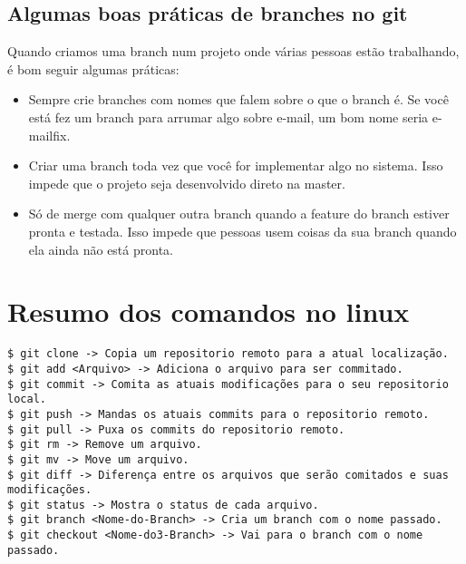 \documentclass{article}
\begin{document}
\subsection{Algumas boas práticas de branches no git}
    Quando criamos uma branch num projeto onde várias pessoas estão trabalhando, é
bom seguir algumas práticas:
\begin{itemize}
    \item Sempre crie branches com nomes que falem sobre o que o branch é. Se
            você está fez um branch para arrumar algo sobre e-mail, um bom nome
            seria e-mailfix.
    \item Criar uma branch toda vez que você for implementar algo no sistema.
            Isso impede que o projeto seja desenvolvido direto na master.
    \item Só de merge com qualquer outra branch quando a feature do branch 
            estiver pronta e testada. Isso impede que pessoas usem coisas
            da sua branch quando ela ainda não está pronta.
\end{itemize}

\section{Resumo dos comandos no linux}
\begin{tabbing}
\hspace{0.5cm}  \=  \verb#$ git clone -> Copia um repositorio remoto para a atual localização.#\\
                \>  \verb#$ git add <Arquivo> -> Adiciona o arquivo para ser commitado.#\\
                \>  \verb#$ git commit -> Comita as atuais modificações para o seu repositorio local.#\\
                \>  \verb#$ git push -> Mandas os atuais commits para o repositorio remoto.#\\
                \>  \verb#$ git pull -> Puxa os commits do repositorio remoto.#\\
                \>  \verb#$ git rm -> Remove um arquivo.#\\
                \>  \verb#$ git mv -> Move um arquivo.#\\
                \>  \verb#$ git diff -> Diferença entre os arquivos que serão comitados e suas modificações.#\\
                \>  \verb#$ git status -> Mostra o status de cada arquivo.#\\
                \>  \verb#$ git branch <Nome-do-Branch> -> Cria um branch com o nome passado.#\\
                \>  \verb#$ git checkout <Nome-do3-Branch> -> Vai para o branch com o nome passado.#\\
\end{tabbing}
\end{document}
